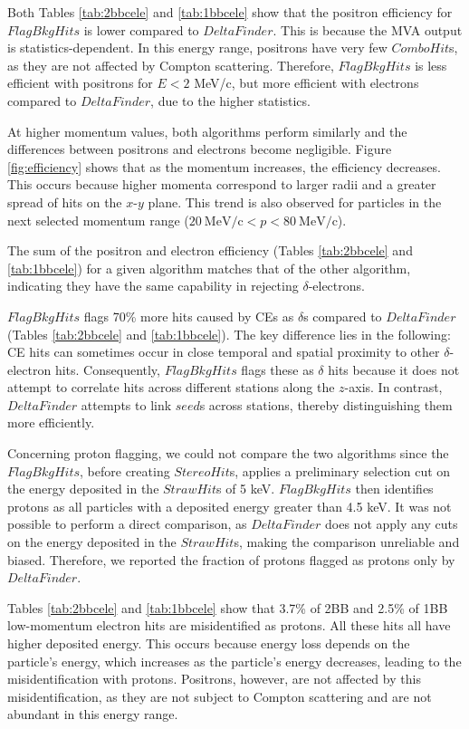 Both Tables \ref{tab:2bbcele} and \ref{tab:1bbcele} 
show that the positron 
efficiency for $FlagBkgHits$ is lower 
compared to $DeltaFinder$. 
This is because the MVA output is 
statistics-dependent. In this 
energy range, positrons have very few $ComboHit$s, as 
they are not affected by Compton scattering. Therefore, 
$FlagBkgHits$ is less efficient with 
positrons for $E < 2$ MeV/c, 
but more efficient with electrons compared to 
$DeltaFinder$, due to the higher statistics.

At higher momentum values, 
both algorithms perform similarly and the 
differences between positrons and 
electrons become negligible. 
Figure \ref{fig:efficiency} shows that as the momentum 
increases, the efficiency decreases. This occurs because 
higher momenta correspond to larger radii and a 
greater spread of hits on the $x$-$y$ plane. 
This trend is also observed for particles in the 
next selected momentum range ($20 \ \text{MeV/c} <p<80 \ \text{MeV/c}$).

The sum of the positron and electron 
efficiency (Tables \ref{tab:2bbcele} 
and \ref{tab:1bbcele}) for a given algorithm 
matches that of the other algorithm, 
indicating they have the same 
capability in rejecting $\delta$-electrons. 

$FlagBkgHits$ flags 70\% more hits caused by CEs 
as $\delta$s compared to $DeltaFinder$ (Tables \ref{tab:2bbcele} 
and \ref{tab:1bbcele}). 
The key difference 
lies in the following: 
CE hits can sometimes occur in close 
temporal and spatial 
proximity to other $\delta$-electron hits. 
Consequently, $FlagBkgHits$ 
flags these as $\delta$ hits 
because it does not attempt to 
correlate hits across different 
stations along the $z$-axis. 
In contrast, $DeltaFinder$ attempts to link $seed$s 
across stations, thereby 
distinguishing them more efficiently.

Concerning proton flagging, we could 
not compare the two 
algorithms since the $FlagBkgHits$, 
before creating $StereoHit$s, 
applies a preliminary selection cut 
on the energy deposited in 
the $StrawHit$s of 5 keV. 
$FlagBkgHits$ then identifies 
protons as all particles with 
a deposited energy greater than 
4.5 keV. It was not possible to 
perform a direct comparison, 
as $DeltaFinder$ does not apply any  
cuts on the energy deposited in 
the $StrawHit$s, making the 
comparison unreliable and biased. 
Therefore, we reported the fraction of protons 
flagged as protons only by $DeltaFinder$.

Tables \ref{tab:2bbcele} and \ref{tab:1bbcele} show 
that 3.7\% of 2BB and 2.5\% of 1BB low-momentum 
electron hits are misidentified as protons. 
All these hits all have 
higher deposited energy. This occurs because 
energy loss depends 
on the particle's energy, which increases as 
the particle's energy 
decreases, leading to the misidentification with protons. 
Positrons, however, 
are not affected by this misidentification, 
as they are not 
subject to Compton scattering and are not 
abundant in this energy range.


